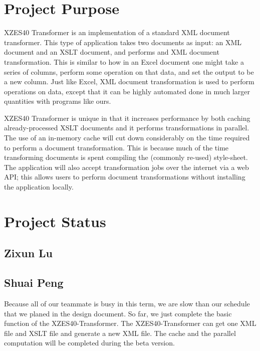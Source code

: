 \section{Project Purpose}

XZES40 Transformer is an implementation of a standard XML document transformer.
This type of application takes two documents as input: an XML document and an XSLT document, and performs and XML document transformation.
This is similar to how in an Excel document one might take a series of columns, perform some operation on that data, and set the output to be a new column.
Just like Excel, XML document transformation is used to perform operations on data, except that it can be highly automated done in much larger quantities with programs like ours.

XZES40 Transformer is unique in that it increases performance by both caching already-processed XSLT documents and it performs transformations in parallel.
The use of an in-memory cache will cut down considerably on the time required to perform a document transformation.
This is because much of the time transforming documents is spent compiling the (commonly re-used) style-sheet.
The application will also accept transformation jobs over the internet via a web API; this allows users to perform document transformations without installing the application locally.

\section{Project Status}

\subsection{Zixun Lu}

\subsection{Shuai Peng}

Because all of our teammate is busy in this term, we are slow than our schedule that we planed in the design document. 
So far, we just complete the basic function of the XZES40-Transformer.
The XZES40-Transformer can get one XML file and XSLT file and generate a new XML file.
The cache and the parallel computation will be completed during the beta version.  

